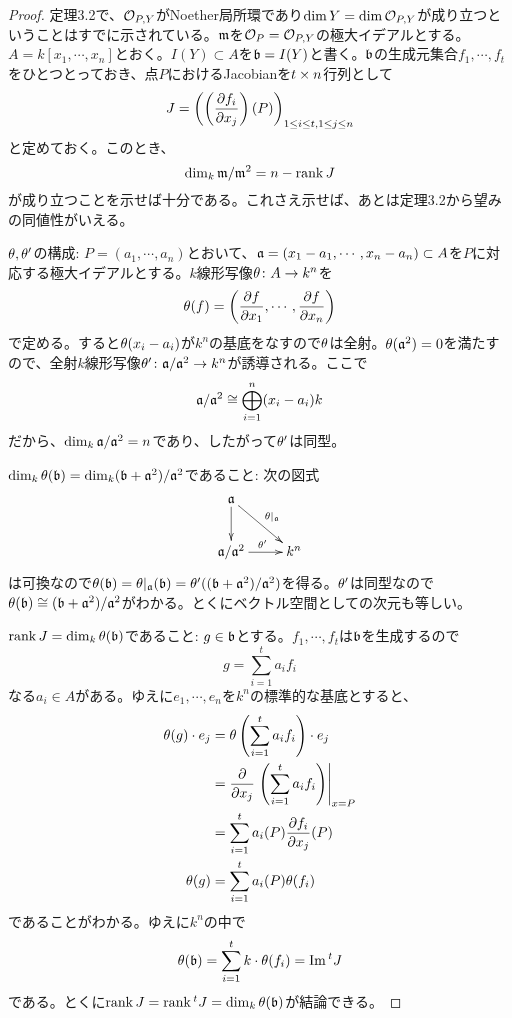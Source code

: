 \begin{proof}
  定理3.2で、$\mathcal{O}_{P,Y}$がNoether局所環であり$\dim Y = \dim \mathcal{O}_{P,Y}$が成り立つということはすでに示されている。$\mathfrak{m}$を$\mathcal{O}_{P} = \mathcal{O}_{P,Y}$の極大イデアルとする。$A=k[x_1, \cdots, x_n]$とおく。$I(Y) \subset A$を$\mathfrak{b} = I(Y)$と書く。$\mathfrak{b}$の生成元集合$f_1, \cdots , f_t$をひとつとっておき、点$P$におけるJacobianを$t \times n$行列として
  \[
  J = \left( \left( \frac{\partial f_i}{\partial x_j} \right) (P) \right)_{1 \leq i \leq t,1 \leq j \leq n}
  \]
  と定めておく。このとき、
  \[
  \dim_k \mathfrak{m} / \mathfrak{m}^2 = n - \operatorname{rank} J
  \]
  が成り立つことを示せば十分である。これさえ示せば、あとは定理3.2から望みの同値性がいえる。

 ${\theta}, {\theta}'$の構成: $P = (a_1, \cdots, a_n)$とおいて、$\mathfrak{a} = (x_1 - a_1, \cdots , x_n - a_n) \subset A$を$P$に対応する極大イデアルとする。$k$線形写像${\theta} \colon A \to k^n$を
  \[
  {\theta}(f) = \left( \frac{\partial f}{\partial x_1} , \cdots, \frac{\partial f}{\partial x_n} \right)
  \]
  で定める。すると${\theta}(x_i - a_i)$が$k^n$の基底をなすので${\theta}$は全射。${\theta} (\mathfrak{a}^2) = 0$を満たすので、全射$k$線形写像${\theta}' \colon \mathfrak{a} / \mathfrak{a}^2 \to k^n$が誘導される。ここで
  \[
\mathfrak{a} / \mathfrak{a}^2 \cong \bigoplus_{i=1}^n (x_i - a_i)k
  \]
  だから、$\dim_k \mathfrak{a} / \mathfrak{a}^2 = n$であり、したがって${\theta}'$は同型。


  $\dim_k {\theta}(\mathfrak{b}) = \dim_k (\mathfrak{b} + \mathfrak{a}^2)/ \mathfrak{a}^2$であること: 次の図式
\[
\xymatrix{
\fraka \ar[rd]^{\grt|_{\fraka}} \ar[d] & { } \\
\fraka / \fraka^2 \ar[r]^{\grt'} & k^n
}
\]
  は可換なので${\theta}(\mathfrak{b}) = {\theta}|_{\mathfrak{a}}(\mathfrak{b}) = {\theta}'( (\mathfrak{b} + \mathfrak{a}^2)/ \mathfrak{a}^2 )$を得る。${\theta}'$は同型なので${\theta}(\mathfrak{b}) \cong (\mathfrak{b} + \mathfrak{a}^2)/ \mathfrak{a}^2 $がわかる。とくにベクトル空間としての次元も等しい。


$\operatorname{rank} J = \dim_k {\theta}(\mathfrak{b})$であること: $g \in \mathfrak{b}$とする。$f_1, \cdots , f_t$は$\mathfrak{b}$を生成するので
\[
g= \sum_{i=1}^t a_i f_i
\]
なる$a_i \in A$がある。ゆえに$e_1, \cdots , e_n$を$k^n$の標準的な基底とすると、
\begin{align*}
  {\theta}(g) \cdot e_j &= {\theta} \left( \sum_{i=1}^t a_i f_i \right) \cdot e_j \\
  &= \frac{\partial}{\partial x_j} \left.\left( \sum_{i=1}^t a_i f_i \right)  \right|_{x=P} \\
  &= \sum_{i=1}^t a_i(P) \frac{ \partial f_i}{\partial x_j}(P) \\
  {\theta}(g) &= \sum_{i=1}^t a_i(P) {\theta}(f_i)
\end{align*}
であることがわかる。ゆえに$k^n$の中で
\[
{\theta}(\mathfrak{b}) = \sum_{i=1}^t k \cdot {\theta}(f_i) = \operatorname{Im} {}^tJ
\]
である。とくに$\operatorname{rank} J = \operatorname{rank} {}^tJ = \dim_k {\theta}(\mathfrak{b})$が結論できる。


\end{proof}
